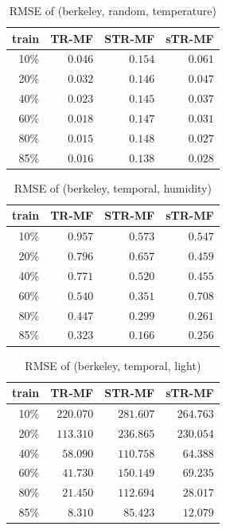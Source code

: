 \begin{table} [htbp]
\setlength{\tabcolsep}{2pt}
\centering
\caption{RMSE of (berkeley, random, temperature)}
\label{table:spatial_random_tem}
\begin{tabular} {r | r r r}
	train	& TR-MF	&	STR-MF	&	sTR-MF	\\ \hline
	10\% & $ \mathbf{ 0.046 } $ & $ 0.154 $ & $ 0.061 $ \\
	20\% & $ \mathbf{ 0.032 } $ & $ 0.146 $ & $ 0.047 $ \\
	40\% & $ \mathbf{ 0.023 } $ & $ 0.145 $ & $ 0.037 $ \\
	60\% & $ \mathbf{ 0.018 } $ & $ 0.147 $ & $ 0.031 $ \\
	80\% & $ \mathbf{ 0.015 } $ & $ 0.148 $ & $ 0.027 $ \\
	85\% & $ \mathbf{ 0.016 } $ & $ 0.138 $ & $ 0.028 $ \\
\end{tabular}
\end{table}




\begin{table} [htbp]
\setlength{\tabcolsep}{2pt}
\centering
\caption{RMSE of (berkeley, temporal, humidity)}
\label{table:spatial_temporal_hum}
\begin{tabular} {r | r r r}
	train	& TR-MF	&	STR-MF	&	sTR-MF	\\ \hline
	10\% & $ 0.957 $ & $ 0.573 $ & $ \mathbf{ 0.547 } $ \\
	20\% & $ 0.796 $ & $ 0.657 $ & $ \mathbf{ 0.459 } $ \\
	40\% & $ 0.771 $ & $ 0.520 $ & $ \mathbf{ 0.455 } $ \\
	60\% & $ 0.540 $ & $ \mathbf{ 0.351 } $ & $ 0.708 $ \\
	80\% & $ 0.447 $ & $ 0.299 $ & $ \mathbf{ 0.261 } $ \\
	85\% & $ 0.323 $ & $ \mathbf{ 0.166 } $ & $ 0.256 $ \\
\end{tabular}
\end{table}

\begin{table} [htbp]
\setlength{\tabcolsep}{2pt}
\centering
\caption{RMSE of (berkeley, temporal, light)}
\label{table:spatial_temporal_light}
\begin{tabular} {r | r r r}
	train	& TR-MF	&	STR-MF	&	sTR-MF	\\ \hline
	10\% & $ \mathbf{ 220.070 } $ & $ 281.607 $ & $ 264.763 $ \\
	20\% & $ \mathbf{ 113.310 } $ & $ 236.865 $ & $ 230.054 $ \\
	40\% & $ \mathbf{ 58.090 } $ & $ 110.758 $ & $ 64.388 $ \\
	60\% & $ \mathbf{ 41.730 } $ & $ 150.149 $ & $ 69.235 $ \\
	80\% & $ \mathbf{ 21.450 } $ & $ 112.694 $ & $ 28.017 $ \\
	85\% & $ \mathbf{ 8.310 } $ & $ 85.423 $ & $ 12.079 $ \\
\end{tabular}
\end{table}


